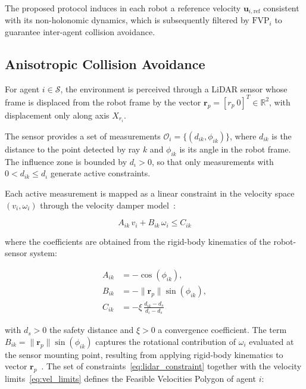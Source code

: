 \noindent The proposed protocol induces in each robot a reference velocity $\mathbf{u}_{i,\text{ref}}$ consistent with its non-holonomic dynamics, which is subsequently filtered by $\text{FVP}_i$ to guarantee inter-agent collision avoidance.

\subsection{Anisotropic Collision Avoidance}

For agent $i \in \mathcal{S}$, the environment is perceived through a LiDAR sensor whose frame is displaced from the robot frame by the vector $\mathbf{r}_p = [r_p\ 0]^T \in \mathbb{R}^2$, with displacement only along axis $X_{r_i}$. 

The sensor provides a set of measurements $\mathcal{O}_i = \{(d_{ik}, \phi_{ik})\}$, where $d_{ik}$ is the distance to the point detected by ray $k$ and $\phi_{ik}$ is its angle in the robot frame. The influence zone is bounded by $d_{\iota} > 0$, so that only measurements with $0 < d_{ik} \leq d_{\iota}$ generate active constraints.

Each active measurement is mapped as a linear constraint in the velocity space $(v_i, \omega_i)$ through the velocity damper model~\cite{ramirez2001collision}:

\begin{equation}
    A_{ik}\, v_i + B_{ik}\, \omega_i \leq C_{ik}
    \label{eq:lidar_constraint}
\end{equation}

\noindent where the coefficients are obtained from the rigid-body kinematics of the robot-sensor system:

\begin{equation}
    \begin{aligned}
        A_{ik} &= -\cos(\phi_{ik}), \\
        B_{ik} &= -\|\mathbf{r}_p\|\sin(\phi_{ik}), \\
        C_{ik} &= -\xi\,\frac{d_{ik} - d_s}{d_{\iota} - d_s}
    \end{aligned}
    \label{eq:coefficients}
\end{equation}

\noindent with $d_s > 0$ the safety distance and $\xi > 0$ a convergence coefficient. The term $B_{ik} = \|\mathbf{r}_p\|\sin(\phi_{ik})$ captures the rotational contribution of $\omega_i$ evaluated at the sensor mounting point, resulting from applying rigid-body kinematics to vector $\mathbf{r}_p$~\cite{ramirez2001collision}. The set of constraints~\eqref{eq:lidar_constraint} together with the velocity limits~\eqref{eq:vel_limits} defines the Feasible Velocities Polygon of agent $i$:

